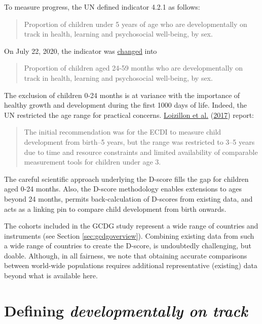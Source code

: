 \documentclass[
]{book}
\begin{document}
To measure progress, the UN defined indicator 4.2.1 as follows:

\begin{quote}
Proportion of children under 5 years of age who are developmentally on track in health, learning and psychosocial well-being, by sex.
\end{quote}

On July 22, 2020, the indicator was \href{https://unstats.un.org/sdgs/metadata/}{changed} into

\begin{quote}
Proportion of children aged 24-59 months who are developmentally on track in health, learning and psychosocial well-being, by sex.
\end{quote}

The exclusion of children 0-24 months is at variance with the importance of healthy growth and development during the first 1000 days of life. Indeed, the UN restricted the age range for practical concerns. \protect\hyperlink{ref-loizillon2017}{Loizillon et al.} (\protect\hyperlink{ref-loizillon2017}{2017}) report:

\begin{quote}
The initial recommendation was for the ECDI to measure child development from birth--5 years, but the range was restricted to 3--5 years due to time and resource constraints and limited availability of comparable measurement tools for children under age 3.
\end{quote}

The careful scientific approach underlying the D-score fills the gap for children aged 0-24 months. Also, the D-score methodology enables extensions to ages beyond 24 months, permits back-calculation of D-scores from existing data, and acts as a linking pin to compare child development from birth onwards.

The cohorts included in the GCDG study represent a wide range of countries and instruments (see Section \ref{sec:gcdgoverview}). Combining existing data from such a wide range of countries to create the D-score, is undoubtedly challenging, but doable. Although, in all fairness, we note that obtaining accurate comparisons between world-wide populations requires additional representative (existing) data beyond what is available here.

\hypertarget{sec:references}{%
\section{\texorpdfstring{Defining \emph{developmentally on track}}{Defining developmentally on track}}\label{sec:references}}
\end{document}
